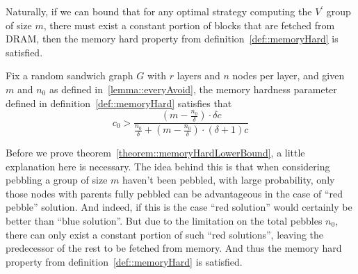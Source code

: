 %

Naturally, if we can bound that for any optimal strategy computing the $V^\prime$ group of size $m$, there must exist a constant portion of blocks that
are fetched from DRAM, then the memory hard property from definition~\ref{def::memoryHard} is satisfied.

\begin{theorem}\label{theorem::memoryHardLowerBound}
  Fix a random sandwich graph $G$ with $r$ layers and $n$ nodes per layer, and given $m$ and $n_0$ as defined in~\ref{lemma::everyAvoid}, the
  memory hardness parameter defined in definition~\ref{def::memoryHard} satisfies that
  \begin{equation}
    c_0 > \frac{(m - \frac{n_0}{\delta}) \cdot \delta c}{\frac{n_0}{\delta} + (m - \frac{n_0}{\delta}) \cdot (\delta + 1)c}
  \end{equation}
\end{theorem}

Before we prove theorem~\ref{theorem::memoryHardLowerBound}, a little explanation here is necessary. The idea behind this is that
when considering pebbling a group of size $m$ haven't been pebbled, with large probability, only those nodes with parents fully
pebbled can be advantageous in the case of ``red pebble'' solution. And indeed, if this is the case ``red solution'' would
certainly be better than ``blue solution''. But due to the limitation on the total pebbles $n_0$, there can only exist a constant
portion of such ``red solutions'', leaving the predecessor of the rest to be fetched from memory. And thus the memory hard property
from definition~\ref{def::memoryHard} is satisfied.

